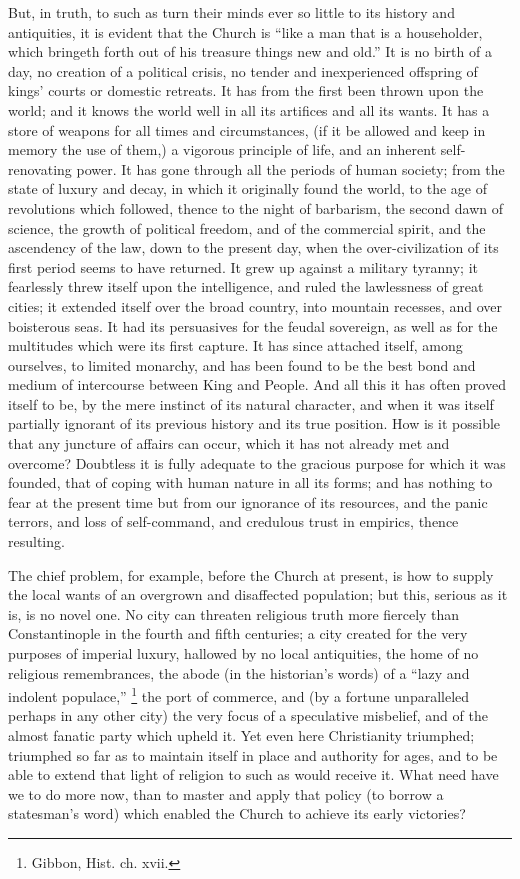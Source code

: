 But, in truth, to such as turn their minds ever
so little to its history and antiquities, it is evident that the
Church is ``like a man that is a householder, which bringeth forth out
of his treasure things new and old.'' It is no birth of a day, no
creation of a political crisis, no tender and inexperienced offspring
of kings' courts or domestic retreats. It has from the first been
thrown upon the world; and it knows the world well in all its
artifices and all its wants. It has a store of weapons for all times
and circumstances, (if it be allowed and keep in memory the use of
them,) a vigorous principle of life, and an inherent self-renovating
power. It has gone through all the periods of human society; from the
state of luxury and decay, in which it originally found the world, to
the age of revolutions which followed, thence to the night of
barbarism, the second dawn of science, the growth of political
freedom, and of the commercial spirit, and the ascendency of the law,
down to the present day, when the over-civilization of its first
period seems to have returned. It grew up against a military tyranny;
it fearlessly threw itself upon the intelligence, and ruled the
lawlessness of great cities; it extended itself over the broad
country, into mountain recesses, and over boisterous seas. It had its
persuasives for the feudal sovereign, as well as for the multitudes
which were its first capture. It has since attached itself, among
ourselves, to limited monarchy, and has been found to be the best bond
and medium of intercourse between King and People. And all this it has
often proved itself to be, by the mere instinct of its natural
character, and when it was itself partially ignorant of its previous
history and its true position. How is it possible that any juncture of
affairs can occur, which it has not already met and overcome?
Doubtless it is fully adequate to the gracious purpose for which it
was founded, that of coping with human nature in all its forms; and
has nothing to fear at the present time but from our ignorance of its
resources, and the panic terrors, and loss of self-command, and
credulous trust in empirics, thence resulting.

The chief problem, for example, before the Church
at present, is how to supply the local wants of an overgrown and
disaffected population; but this, serious as it is, is no novel one.
No city can threaten religious truth more fiercely than Constantinople
in the fourth and fifth centuries; a city created for the very
purposes of imperial luxury, hallowed by no local antiquities, the
home of no religious remembrances, the abode (in the historian's
words) of a ``lazy and indolent populace,'' \footnote{Gibbon, Hist. ch. xvii.} the port of commerce, and (by a fortune unparalleled perhaps in
any other city) the very focus of a speculative misbelief, and of the
almost fanatic party which upheld it. Yet even here Christianity
triumphed; triumphed so far as to maintain itself in place and
authority for ages, and to be able to extend that light of
religion to such as would receive it. What need have we to do more
now, than to master and apply that policy (to borrow a statesman's
word) which enabled the Church to achieve its early victories?

